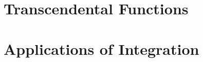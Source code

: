 \iflatetranscendentals
\chapter{Transcendental Functions}

\else
\chapter{Applications of Integration}











\fi
